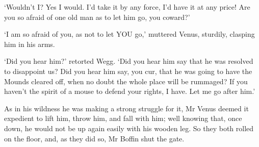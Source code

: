 ‘Wouldn’t I? Yes I would. I’d take it by any force, I’d have it at any
price! Are you so afraid of one old man as to let him go, you coward?’

‘I am so afraid of you, as not to let YOU go,’ muttered Venus, sturdily,
clasping him in his arms.

‘Did you hear him?’ retorted Wegg. ‘Did you hear him say that he was
resolved to disappoint us? Did you hear him say, you cur, that he was
going to have the Mounds cleared off, when no doubt the whole place will
be rummaged? If you haven’t the spirit of a mouse to defend your rights,
I have. Let me go after him.’

As in his wildness he was making a strong struggle for it, Mr Venus
deemed it expedient to lift him, throw him, and fall with him; well
knowing that, once down, he would not be up again easily with his wooden
leg. So they both rolled on the floor, and, as they did so, Mr Boffin
shut the gate.



